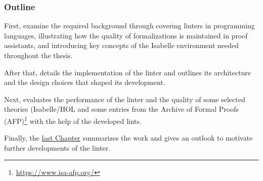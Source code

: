 \subsubsection{Outline}
First,  examine the required background through 
covering linters in programming languages, illustrating how the quality of
formalizations is maintained in proof assistants, and introducing key concepts
of the Isabelle environment needed throughout the thesis.

After that,  details the implementation of the linter and outlines 
its architecture and the design choices that shaped its development.

Next,  evaluates the performance of the linter and the quality of 
some selected theories (Isabelle/HOL and some entries from the
Archive of Formal Proofs (AFP)\footnote{\url{https://www.isa-afp.org/}} with the help of the developed lints.

Finally, the \hyperref[chapter:conclusion]{last Chapter} summarizes the work and gives an outlook to motivate
further developments of the linter.